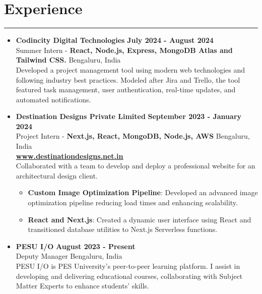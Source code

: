 \documentclass[a4paper,10.5pt]{article}  %
\begin{document}
\section*{Experience}
\vspace{-.3em}
\hrule
\vspace{0.4em}
\begin{itemize}
    \item \textbf{Codincity Digital Technologies} \hfill \textbf{July 2024 - August 2024} \vspace{0.3em} \\ 
    Summer Intern - \textbf{React, Node.js, Express, MongoDB Atlas and Tailwind CSS.} \vspace{0.3em} \hfill Bengaluru, India \\
    Developed a project management tool using modern web technologies and following industry best practices. Modeled after Jira and Trello, the tool featured task management, user authentication, real-time updates, and automated notifications.
          
    \item \vspace{0.3em} \textbf{Destination Designs Private Limited} \hfill \textbf{September 2023 - January 2024} \vspace{0.3em} \\
          Project Intern - \textbf{Next.js, React, MongoDB, Node.js, AWS} \hfill Bengaluru, India \\ \textbf{\href{https://www.destinationdesigns.net.in/}
          {\underline{www.destinationdesigns.net.in}}}  \vspace{0.3em} \\ Collaborated with a team to develop and deploy a professional website for an architectural design client. 
	      \begin{itemize}
		      \item \textbf{Custom Image Optimization Pipeline}: Developed an advanced image optimization pipeline reducing load times and enhancing scalability.
		      \item \textbf{React and Next.js}: Created a dynamic user interface using React and transitioned database utilities to Next.js Serverless functions.
	      \end{itemize}
    \item \vspace{0.3em} \textbf{PESU I/O} \hfill \textbf{August 2023 - Present} \\ 
    Deputy Manager \hfill Bengaluru, India \vspace{0.3em} \\
    PESU I/O is PES University's peer-to-peer learning platform. I assist in developing and delivering educational courses, collaborating with Subject Matter Experts to enhance students' skills.
\end{itemize}
\end{document}
